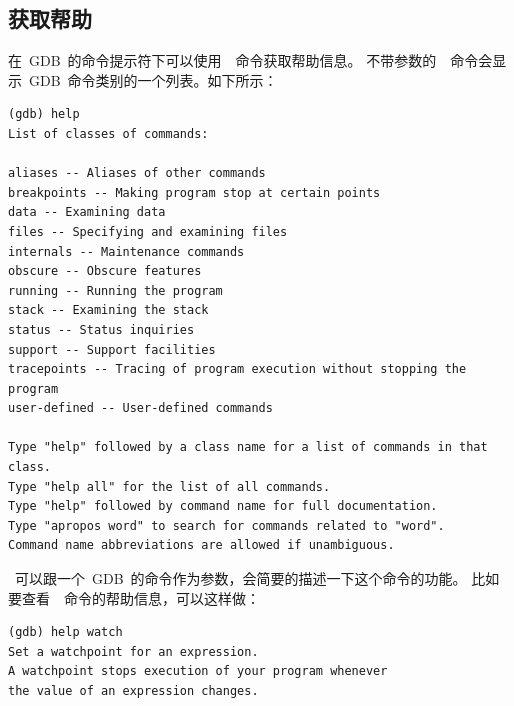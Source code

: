 \subsection{获取帮助}
在~GDB~的命令提示符下可以使用~~命令获取帮助信息。
不带参数的~~命令会显示~GDB~命令类别的一个列表。如下所示：
\begin{lstlisting}
(gdb) help
List of classes of commands:

aliases -- Aliases of other commands
breakpoints -- Making program stop at certain points
data -- Examining data
files -- Specifying and examining files
internals -- Maintenance commands
obscure -- Obscure features
running -- Running the program
stack -- Examining the stack
status -- Status inquiries
support -- Support facilities
tracepoints -- Tracing of program execution without stopping the program
user-defined -- User-defined commands

Type "help" followed by a class name for a list of commands in that class.
Type "help all" for the list of all commands.
Type "help" followed by command name for full documentation.
Type "apropos word" to search for commands related to "word".
Command name abbreviations are allowed if unambiguous.
\end{lstlisting}
~可以跟一个~GDB~的命令作为参数，会简要的描述一下这个命令的功能。
比如要查看~~命令的帮助信息，可以这样做：
\begin{lstlisting}
(gdb) help watch
Set a watchpoint for an expression.
A watchpoint stops execution of your program whenever
the value of an expression changes.
\end{lstlisting}

